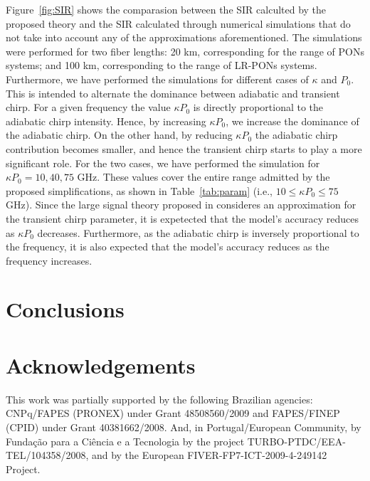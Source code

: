 \documentclass[journal]{IEEEtran}
\begin{document}
Figure~\ref{fig:SIR} shows the comparasion between the SIR calculted by the proposed theory and the SIR calculated through numerical simulations that do not take into account any of the approximations aforementioned. The simulations were performed for two fiber lengths: 20 km, corresponding for the range of PONs systems; and 100 km, corresponding to the range of LR-PONs systems. Furthermore, we have performed the simulations for different cases of $\kappa$ and $P_0$. This is intended to alternate the dominance between adiabatic and transient chirp. For a given frequency the value $\kappa P_0$ is directly proportional to the adiabatic chirp intensity. Hence, by increasing $\kappa P_0$, we increase the dominance of the adiabatic chirp. On the other hand, by reducing $\kappa P_0$ the adiabatic chirp contribution becomes smaller, and hence the transient chirp starts to play a more significant role. For the two cases, we have performed the simulation for $\kappa P_0 = 10, 40, 75$ GHz. These values cover the entire range admitted by the proposed simplifications, as shown in Table~\ref{tab:param} (i.e., $10 \leq \kappa P_0 \leq 75$ GHz). Since the large signal theory proposed in \cite{eva} consideres an approximation for the transient chirp parameter, it is expetected that the model's accuracy reduces as $\kappa P_0$ decreases. Furthermore, as the adiabatic chirp is inversely proportional to the frequency, it is also expected that the model's accuracy reduces as the frequency increases.

\section{Conclusions} \label{sec:conclusion}

\section*{Acknowledgements}
This work was partially supported by the following Brazilian agencies: CNPq/FAPES (PRONEX) under Grant 48508560/2009 and FAPES/FINEP (CPID) under Grant 40381662/2008. And, in Portugal/European Community, by Fundação para a Ciência e a Tecnologia by the project TURBO-PTDC/EEA-TEL/104358/2008, and by the European FIVER-FP7-ICT-2009-4-249142 Project. 
\end{document}

